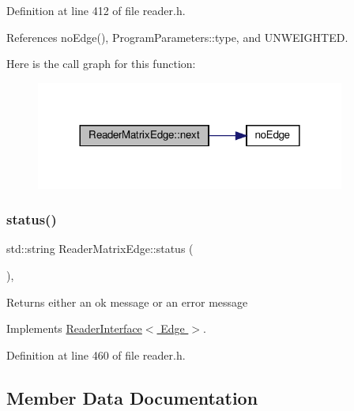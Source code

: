 Definition at line 412 of file reader.\+h.



References no\+Edge(), Program\+Parameters\+::type, and U\+N\+W\+E\+I\+G\+H\+T\+ED.

Here is the call graph for this function\+:\nopagebreak
\begin{figure}[H]
\begin{center}
\leavevmode
\includegraphics[width=288pt]{classReaderMatrixEdge_a98657215956d975c4f81b7e1d6e90b3e_cgraph}
\end{center}
\end{figure}
\mbox{\label{classReaderMatrixEdge_a14cfd06f703e6a24d007514e5dee24ff}} 
\subsubsection{\texorpdfstring{status()}{status()}}
{\footnotesize\ttfamily std\+::string Reader\+Matrix\+Edge\+::status (\begin{DoxyParamCaption}{ }\end{DoxyParamCaption})\hspace{0.3cm}{\ttfamily [inline]}, {\ttfamily [virtual]}}

\begin{DoxyReturn}{Returns}
either an ok message or an error message 
\end{DoxyReturn}


Implements \hyperlink{classReaderInterface_a5f86ed49eac808ed0a912f7d670c4042}{Reader\+Interface$<$ Edge $>$}.



Definition at line 460 of file reader.\+h.



\subsection{Member Data Documentation}
\mbox{\label{classReaderMatrixEdge_ab8d64c5359cb60152b277b735616f3fd}} 
